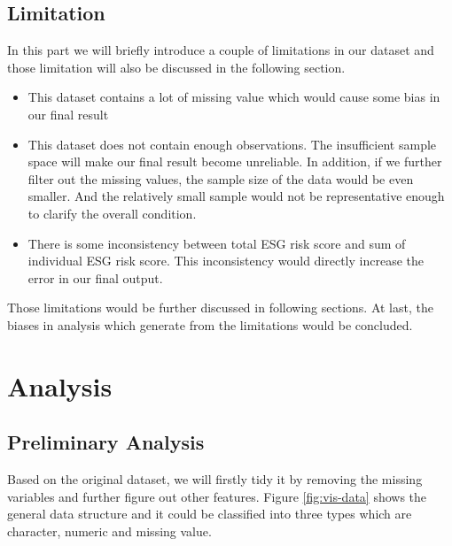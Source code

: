 \documentclass[11pt,a4paper,]{article}
\providecommand{\tightlist}{%
  \setlength{\itemsep}{0pt}\setlength{\parskip}{0pt}}
\begin{document}
\hypertarget{limitation}{%
\subsection{Limitation}\label{limitation}}

In this part we will briefly introduce a couple of limitations in our dataset and those limitation will also be discussed in the following section.

\begin{itemize}
\tightlist
\item
  This dataset contains a lot of missing value which would cause some bias in our final result
\item
  This dataset does not contain enough observations. The insufficient sample space will make our final result become unreliable. In addition, if we further filter out the missing values, the sample size of the data would be even smaller. And the relatively small sample would not be representative enough to clarify the overall condition.
\item
  There is some inconsistency between total ESG risk score and sum of individual ESG risk score. This inconsistency would directly increase the error in our final output.
\end{itemize}

Those limitations would be further discussed in following sections. At last, the biases in analysis which generate from the limitations would be concluded.

\hypertarget{analysis}{%
\section{Analysis}\label{analysis}}

\hypertarget{preliminary-analysis}{%
\subsection{Preliminary Analysis}\label{preliminary-analysis}}

Based on the original dataset, we will firstly tidy it by removing the missing variables and further figure out other features. Figure \ref{fig:vis-data} shows the general data structure and it could be classified into three types which are character, numeric and missing value.
\end{document}

